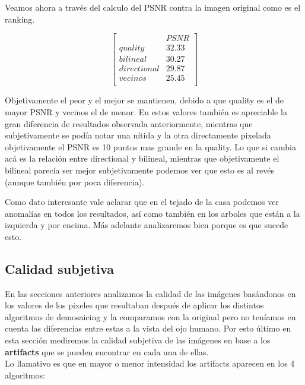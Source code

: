 {Veamos ahora a través del calculo del PSNR contra la imagen original como es el ranking.

$$ 
\begin{bmatrix}
           &      PSNR    \\
       quality    &   32.33   \\
       bilineal    &      30.27   \\
       directional    &      29.87    \\
       vecinos   &      25.45     \\
\end{bmatrix} 
$$

Objetivamente el peor y el mejor se mantienen, debido a que quality es el de mayor PSNR y vecinos el de menor. En estos valores también es apreciable la gran diferencia de resultados observada anteriormente, mientras que subjetivamente se podía notar una nítida y la otra directamente pixelada objetivamente el PSNR es 10 puntos mas grande en la quality. Lo que si cambia acá es la relación entre directional y bilineal, mientras que objetivamente el bilineal parecía ser mejor subjetivamente podemos ver que esto es al revés (aunque también por poca diferencia).

Como dato interesante vale aclarar que en el tejado de la casa podemos ver anomalías en todos los resultados, así como también en los arboles que están a la izquierda y por encima. Más adelante analizaremos bien porque es que sucede esto.


\newpage

\subsection{Calidad subjetiva}

En las secciones anteriores analizamos la calidad de las imágenes basándonos en los valores de los pixeles que resultaban después de aplicar los distintos algoritmos de demosaicing y la comparamos con la original pero no teníamos en cuenta las diferencias entre estas a la vista del ojo humano. Por esto último en esta sección mediremos la calidad subjetiva de las imágenes en base a los \textbf{artifacts} que se pueden encontrar en cada una de ellas.\\
Lo llamativo es que en mayor o menor intensidad los artifacts aparecen en los 4 algoritmos:

}
